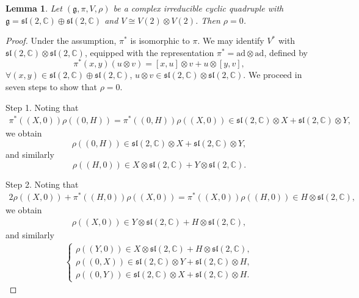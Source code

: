 \documentclass[reqno]{amsart}
\newtheorem{lem}[thm]{Lemma}
\theoremstyle{definition}
\begin{document}
\begin{lem}\label{5.2-lem2}
Let $(\mathfrak{g},\pi,V,\rho)$ be a complex irreducible cyclic quadruple with $\mathfrak{g}=\mathfrak{sl}(2,\mathbb{C})\oplus\mathfrak{sl}(2,\mathbb{C})$
and  $V\cong V(2)\otimes V(2)$.  Then $\rho=0$.
\end{lem}
\begin{proof}
Under the assumption, $\pi^{\ast}$ is isomorphic to $\pi$.
We may identify $V^{\ast}$ with $\mathfrak{sl}(2,\mathbb{C})\otimes\mathfrak{sl}(2,\mathbb{C})$, equipped with the representation $\pi^{\ast}=\mathrm{ad}\otimes \mathrm{ad}$, defined by
$$\pi^{\ast}(x,y)(u\otimes v)=[x,u]\otimes v+u\otimes [y,v],$$
$\forall (x,y)\in \mathfrak{sl}(2,\mathbb{C})\oplus\mathfrak{sl}(2,\mathbb{C})$, $u\otimes v\in \mathfrak{sl}(2,\mathbb{C})\otimes \mathfrak{sl}(2,\mathbb{C})$.
We proceed in seven steps to show that $\rho=0$.

Step 1. Noting that
\begin{eqnarray*}
\pi^{\ast}((X,0))\rho((0,H))=\pi^{\ast}((0,H))\rho((X,0))\in \mathfrak{sl}(2,\mathbb{C}) \otimes X+\mathfrak{sl}(2,\mathbb{C})\otimes Y,
\end{eqnarray*}
we obtain
$$\rho((0,H))\in \mathfrak{sl}(2,\mathbb{C}) \otimes X+\mathfrak{sl}(2,\mathbb{C})\otimes Y,$$
and similarly
$$\rho((H,0))\in X\otimes\mathfrak{sl}(2,\mathbb{C}) +Y\otimes\mathfrak{sl}(2,\mathbb{C}).$$

Step 2. Noting that
\begin{eqnarray*}
2\rho((X,0))+\pi^{\ast}((H,0))\rho((X,0))=\pi^{\ast}((X,0))\rho((H,0))\in H\otimes \mathfrak{sl}(2,\mathbb{C}),
\end{eqnarray*}
we obtain
\begin{eqnarray*}
\rho((X,0))\in Y\otimes\mathfrak{sl}(2,\mathbb{C}) +H\otimes\mathfrak{sl}(2,\mathbb{C}),
\end{eqnarray*}
and similarly
\begin{eqnarray*}
\begin{cases}
\rho((Y,0))\in X\otimes\mathfrak{sl}(2,\mathbb{C}) +H\otimes\mathfrak{sl}(2,\mathbb{C}),\\
\rho((0,X))\in \mathfrak{sl}(2,\mathbb{C}) \otimes Y+\mathfrak{sl}(2,\mathbb{C})\otimes H,\\
\rho((0,Y))\in \mathfrak{sl}(2,\mathbb{C}) \otimes X+\mathfrak{sl}(2,\mathbb{C})\otimes H.
\end{cases}
\end{eqnarray*}


\end{proof}
\end{document}
